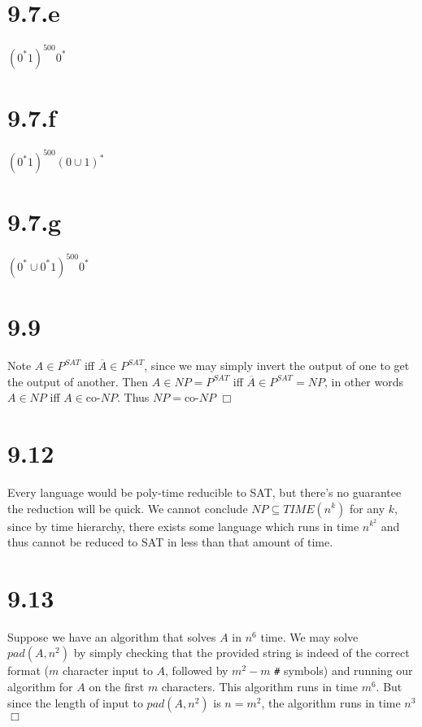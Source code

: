 \documentclass{article}
\begin{document}
\section*{9.7.e}
$(0^*1)^{500}0^*$

\section*{9.7.f}
$(0^*1)^{500}(0\cup1)^*$

\section*{9.7.g}
$(0^* \cup 0^*1)^{500}0^*$

\section*{9.9}
Note $A \in P^{SAT}$ iff $\overline{A} \in P^{SAT}$, since we may simply invert the output of one to get the output of another. Then $A \in NP = P^{SAT}$ iff $\overline{A} \in P^{SAT} = NP$, in other words $A \in NP$ iff $A \in \text{co-}NP$. Thus $NP = \text{co-}NP$ $\Box$

\section*{9.12}
Every language would be poly-time reducible to SAT, but there's no guarantee the reduction will be quick. We cannot conclude $NP \subseteq TIME(n^k)$ for any $k$, since by time hierarchy, there exists some language which runs in time $n^{k^2}$ and thus cannot be reduced to SAT in less than that amount of time.

\section*{9.13}
Suppose we have an algorithm that solves $A$ in $n^6$ time. We may solve $pad(A,n^2)$ by simply checking that the provided string is indeed of the correct format ($m$ character input to $A$, followed by $m^2-m$ \verb|#| symbols) and running our algorithm for $A$ on the first $m$ characters. This algorithm runs in time $m^6$. But since the length of input to $pad(A,n^2)$ is $n = m^2$, the algorithm runs in time $n^3$ $\Box$
\end{document}
